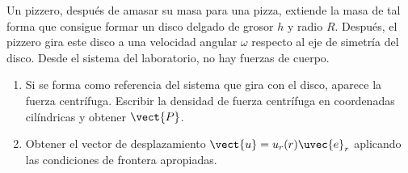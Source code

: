\documentclass[../main.tex]{subfiles}
\begin{document}
\begin{problema}
	Un pizzero, después de amasar su masa para una pizza, extiende la masa
	de tal forma que consigue formar un disco delgado de grosor \(h\) y
	radio \(R\). Después, el pizzero gira este disco a una velocidad angular
	\(\omega\) respecto al eje de simetría del disco. Desde el sistema
	del laboratorio, no hay fuerzas de cuerpo.

	\begin{enumerate}
		\item Si se forma como referencia del sistema que gira con el disco,
		      aparece la fuerza centrífuga. Escribir la densidad de fuerza
		      centrífuga en coordenadas cilíndricas y obtener \(\vect{P}\).
		\item Obtener el vector de desplazamiento \(\vect{u} = u_{r}(r)\uvec{e}_{r}\)
		      aplicando las condiciones de frontera apropiadas.
	\end{enumerate}
\end{problema}
\end{document}
